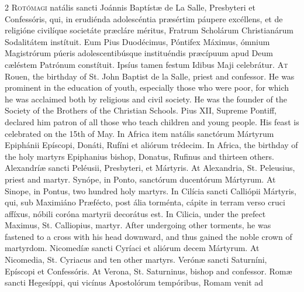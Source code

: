 \begin{paracol}{2}
\lettrine[lines=2]{R}{otómagi} natális 
 sancti Joánnis Baptístæ de La Salle, Presbyteri et Confessóris, qui, in 
 erudiénda adolescéntia præsértim páupere excéllens, et de religióne 
 civilíque societáte præcláre méritus, Fratrum Scholárum Christianárum 
 Sodalitátem instítuit. Eum Pius Duodécimus, Póntifex Máximus, ómnium 
 Magistrórum púeris adolescentibúsque instituéndis præcípuum apud Deum 
 cæléstem Patrónum constítuit. Ipsíus tamen festum Idibus Maji 
 celebrátur.
\switchcolumn
{}
\lettrine[lines=2]{A}{t} Rouen, the birthday of St. John 
 Baptist de la Salle, priest and confessor. He was prominent in the 
 education of youth, especially those who were poor, for which he was 
 acclaimed both by religious and civil society. He was the founder of 
 the Society of the Brothers of the Christian Schools. Pius XII, 
 Supreme Pontiff, declared him patron of all those who teach children and 
 young people. His feast is celebrated on the 15th of May.
\switchcolumn*
{}
In Africa item natális sanctórum Mártyrum Epiphánii Epíscopi, 
 Donáti, Rufíni et aliórum trédecim.
\switchcolumn
{}
In Africa, 
 the birthday of the holy martyrs Epiphanius bishop, Donatus, Rufinus and 
 thirteen others.
\switchcolumn*
{}
Alexandríæ sancti Peléusii, Presbyteri, et Mártyris.
\switchcolumn
{}
At Alexandria, St. Peleusius, 
 priest and martyr.
\switchcolumn*
{}
Synópe, in Ponto, sanctórum ducentórum Mártyrum.
\switchcolumn
{}
At Sinope, in Pontus, two hundred holy martyrs.
\switchcolumn*
{}
In Cilícia sancti Calliópii Mártyris, qui, sub Maximiáno Præfécto, post 
 ália torménta, cápite in terram verso cruci affíxus, nóbili coróna martyrii 
 decorátus est.
\switchcolumn
{}
In Cilicia, under the prefect Maximus, St. Calliopius, martyr. 
 After undergoing other torments, he was fastened to a cross with his head 
 downward, and thus gained the noble crown of martyrdom.
\switchcolumn*
{}
Nicomedíæ sancti Cyríaci et aliórum decem Mártyrum.
\switchcolumn
{}
At Nicomedia, St. Cyriacus and ten other martyrs.
\switchcolumn*
{}
Verónæ sancti Saturníni, Epíscopi et Confessóris.
\switchcolumn
{}
At Verona, St. Saturninus, bishop and confessor.
\switchcolumn*
{}
Romæ sancti Hegesíppi, qui vicínus Apostolórum tempóribus, Romam venit ad 

\end{paracol}
